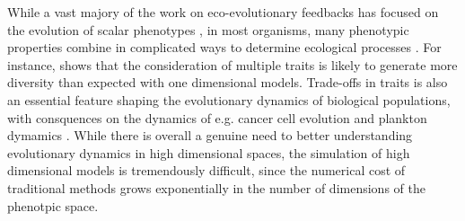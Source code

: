 While a vast majory of the work on eco-evolutionary feedbacks has focused on the evolution of scalar phenotypes \citep{Doebeli2011}, in most organisms, many phenotypic properties combine in complicated ways to determine ecological processes \citep{Doebeli2014}.
% 
For instance, \cite{Doebeli2011} shows that the consideration of multiple traits is likely to generate more diversity than expected with one dimensional models.
% 
% 
Trade-offs in traits is also an essential feature shaping the evolutionary dynamics of biological populations, with consquences on the dynamics of e.g. cancer cell evolution \xxx and plankton dymamics \xxx.
% 
While there is overall a genuine need to better understanding evolutionary dynamics in high dimensional spaces, the simulation of high dimensional models is tremendously difficult, since the numerical cost of traditional methods grows exponentially in the number of dimensions of the phenotpic space. 
% 

